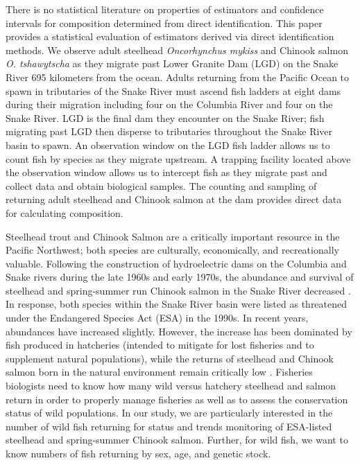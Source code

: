 \documentclass[11pt]{article}
\begin{document}
There is no statistical literature on properties of estimators and confidence intervals for composition determined from direct identification. This paper provides a statistical evaluation of estimators derived via direct identification methods. We observe adult steelhead \textit{Oncorhynchus mykiss} and Chinook salmon \textit{O. tshawytscha} as they migrate past Lower Granite Dam (LGD) on the Snake River 695 kilometers from the ocean. Adults returning from the Pacific Ocean to spawn in tributaries of the Snake River must ascend fish ladders at eight dams during their migration including four on the Columbia River and four on the Snake River. LGD is the final dam they encounter on the Snake River; fish migrating past LGD then disperse to tributaries throughout the Snake River basin to spawn. An observation window on the LGD fish ladder allows us to count fish by species as they migrate upstream.  A trapping facility located above the observation window allows us to intercept fish as they migrate past and collect data and obtain biological samples.  The counting and sampling of returning adult steelhead and Chinook salmon at the dam provides direct data for calculating composition.

Steelhead trout and Chinook Salmon are a critically important resource in the Pacific Northwest; both species are culturally, economically, and recreationally valuable. Following the construction of hydroelectric dams on the Columbia and Snake rivers during the late 1960s and early 1970s, the abundance and survival of steelhead and spring-summer run Chinook salmon in the Snake River decreased \cite{Raymond88}. In response, both species within the Snake River basin were listed as threatened under the Endangered Species Act (ESA) in the 1990s. In recent years, abundances have increased slightly. However, the increase has been dominated by fish produced in hatcheries (intended to mitigate for lost fisheries and to supplement natural populations), while the returns of steelhead and Chinook salmon born in the natural environment remain critically low \cite{Busby1996}. Fisheries biologists need to know how many wild versus hatchery steelhead and salmon return in order to properly manage fisheries as well as to assess the conservation status of wild populations. In our study, we are particularly interested in the number of wild fish returning for status and trends monitoring of ESA-listed steelhead and spring-summer Chinook salmon. Further, for wild fish, we want to know numbers of fish returning by sex, age, and genetic stock.
\end{document}
